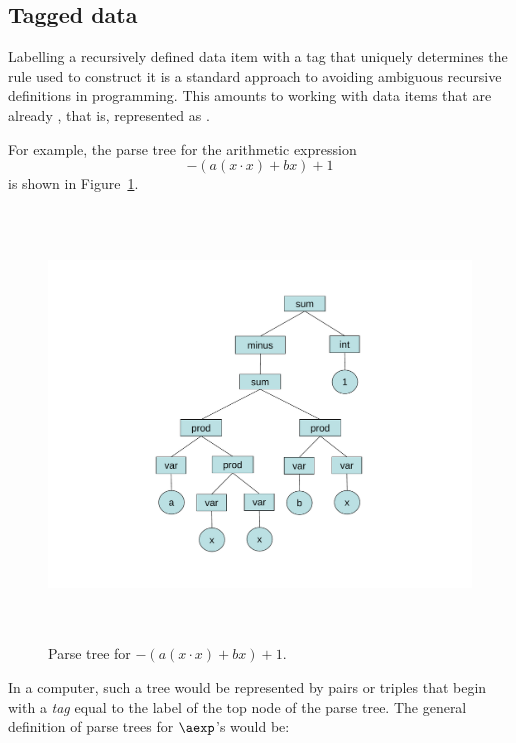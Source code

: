 \begin{editingnotes}

\section{Tagged data}

Labelling a recursively defined data item with a tag that uniquely
determines the rule used to construct it is a standard approach to
avoiding ambiguous recursive definitions in programming.  This
amounts to working with data items that are already , that
is, represented as .

For example, the parse tree for the arithmetic expression
\begin{equation}\label{ax}
-(a(x\cdot x)+ bx) + 1
\end{equation}
is shown in Figure~\ref{fig:parse}.

\begin{figure}[htbp]
\centering \includegraphics[height=4.5in]{figures/parsetree.pdf}
\caption{Parse tree for $-(a(x\cdot x)+ bx) + 1$.}
\label{fig:parse}
\end{figure}

In a computer, such a tree would be represented by pairs or triples
that begin with a
\emph{tag} equal to the label of the top node of the parse tree.  
The general definition of parse trees for $\aexp$'s would be:

\newcommand{\paexp}{\text{Aexp-parse-tree}}


\end{editingnotes}
